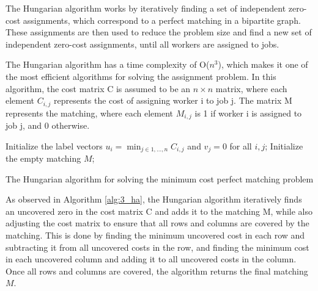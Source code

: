 The Hungarian algorithm works by iteratively finding a set of independent zero-cost assignments, which correspond to a perfect matching in a bipartite graph. These assignments are then used to reduce the problem size and find a new set of independent zero-cost assignments, until all workers are assigned to jobs.

The Hungarian algorithm has a time complexity of O($n^3$), which makes it one of the most efficient algorithms for solving the assignment problem. In this algorithm, the cost matrix C is assumed to be an $n \times n$ matrix, where each element $C_{i,j}$ represents the cost of assigning worker i to job j. The matrix M represents the matching, where each element $M_{i,j}$ is 1 if worker i is assigned to job j, and 0 otherwise.

\begin{algorithm}[]
	\SetAlgoLined
	\DontPrintSemicolon
	Initialize the label vectors $u_i = \min_{j\in{1,\dots,n}} C_{i,j}$ and $v_j=0$ for all $i,j$;
	Initialize the empty matching $M$;
	\caption{The Hungarian algorithm for solving the minimum cost perfect matching problem}
	\label{alg:3_ha}
\end{algorithm}

As observed in Algorithm \ref{alg:3_ha}, the Hungarian algorithm iteratively finds an uncovered zero in the cost matrix C and adds it to the matching M, while also adjusting the cost matrix to ensure that all rows and columns are covered by the matching. This is done by finding the minimum uncovered cost in each row and subtracting it from all uncovered costs in the row, and finding the minimum cost in each uncovered column and adding it to all uncovered costs in the column. Once all rows and columns are covered, the algorithm returns the final matching $M$.

